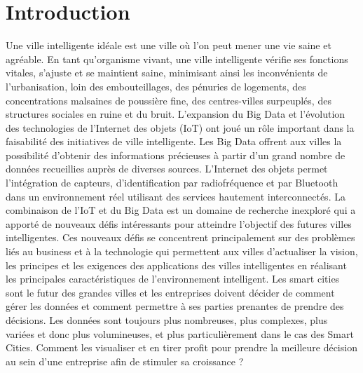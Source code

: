 \documentclass[french, a4paper, 12pt]{report}
\begin{document}
\chapter*{Introduction}
Une ville intelligente idéale est une ville où l’on peut mener une vie saine et agréable. En tant qu’organisme vivant, une ville intelligente vérifie ses fonctions vitales, s’ajuste et se maintient saine, minimisant ainsi les inconvénients de l’urbanisation, loin des embouteillages, des pénuries de logements, des concentrations malsaines de poussière fine, des centres-villes surpeuplés, des structures sociales en ruine et du bruit.
L'expansion du Big Data et l'évolution des technologies de l'Internet des objets (IoT) ont joué un rôle important dans la faisabilité des initiatives de ville intelligente. Les Big Data offrent aux villes la possibilité d’obtenir des informations précieuses à partir d’un grand nombre de données recueillies auprès de diverses sources. L’Internet des objets permet l’intégration de capteurs, d’identification par radiofréquence et par Bluetooth dans un environnement réel utilisant des services hautement interconnectés. La combinaison de l'IoT  et du Big Data est un domaine de recherche inexploré qui a apporté de nouveaux défis intéressants pour atteindre l'objectif des futures villes intelligentes. Ces nouveaux défis se concentrent principalement sur des problèmes liés au business et à la technologie qui permettent aux villes d’actualiser la vision, les principes et les exigences des applications des villes intelligentes en réalisant les principales caractéristiques de l’environnement intelligent. Les smart cities sont le futur des grandes villes et les entreprises doivent décider de comment gérer les données et comment permettre à ses parties prenantes de prendre des décisions. Les données sont toujours plus nombreuses, plus complexes, plus variées et donc plus volumineuses, et plus particulièrement dans le cas des Smart Cities. Comment les visualiser et en tirer profit pour prendre la meilleure décision au sein d’une entreprise afin de stimuler sa croissance ? \\
\end{document}
